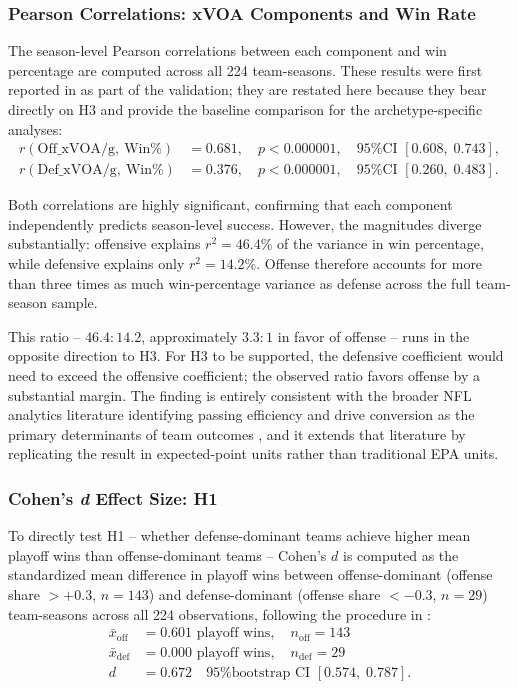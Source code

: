 \subsubsection{Pearson Correlations: xVOA Components and Win Rate}
\label{sec:pearson-results}

The season-level Pearson correlations between each \xvoa{} component and
win percentage are computed across all 224 team-seasons. These results were
first reported in  as part of the \gds{} validation;
they are restated here because they bear directly on H3 and provide the
baseline comparison for the archetype-specific analyses:
\begin{align*}
  r(\text{Off\_xVOA/g},\ \text{Win\%}) &= 0.681,
  \quad p < 0.000001, \quad \text{95\% CI } [0.608,\; 0.743], \\
  r(\text{Def\_xVOA/g},\ \text{Win\%}) &= 0.376,
  \quad p < 0.000001, \quad \text{95\% CI } [0.260,\; 0.483].
\end{align*}

Both correlations are highly significant, confirming that each component
independently predicts season-level success. However, the magnitudes diverge
substantially: offensive \xvoa{} explains $r^2 = 46.4\%$ of the variance in
win percentage, while defensive \xvoa{} explains only $r^2 = 14.2\%$. Offense
therefore accounts for more than three times as much win-percentage variance as
defense across the full team-season sample.

This ratio -- $46.4 : 14.2$, approximately $3.3 : 1$ in favor of offense -- runs
in the opposite direction to H3. For H3 to be supported, the defensive
coefficient would need to exceed the offensive coefficient; the observed ratio
favors offense by a substantial margin. The finding is entirely consistent
with the broader NFL analytics literature identifying passing efficiency and
drive conversion as the primary determinants of team outcomes
\parencite{yurko2019nflwar}, and it extends that literature by replicating the
result in expected-point units rather than traditional EPA units.

\subsubsection{Cohen's \textit{d} Effect Size: H1}
\label{sec:cohens-d-results}

To directly test H1 -- whether defense-dominant teams achieve higher mean
playoff wins than offense-dominant teams -- Cohen's $d$ is computed as the
standardized mean difference in playoff wins between offense-dominant
(offense share $> +0.3$, $n = 143$) and defense-dominant
(offense share $< -0.3$, $n = 29$) team-seasons across all 224
observations, following the procedure in :
\begin{align*}
  \bar{x}_{\mathrm{off}} &= 0.601 \text{ playoff wins}, \quad n_{\mathrm{off}} = 143 \\
  \bar{x}_{\mathrm{def}} &= 0.000 \text{ playoff wins}, \quad n_{\mathrm{def}} = 29 \\
  d &= 0.672 \quad \text{95\% bootstrap CI } [0.574,\; 0.787].
\end{align*}

